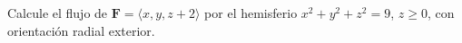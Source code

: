 ﻿Calcule el flujo de $\mathbf F=\langle x,y,z+2\rangle$ por el hemisferio $x^2+y^2+z^2=9$, $z\geq0$, con orientación radial exterior.
